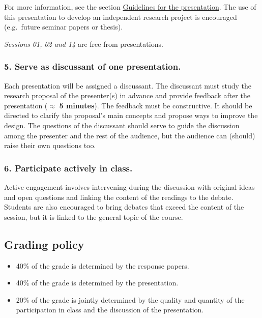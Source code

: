 \documentclass[
  12pt,
]{article}
\begin{document}
For more information, see the section
\protect\hyperlink{guidelines-for-the-presentation}{Guidelines for the
presentation}. The use of this presentation to develop an independent
research project is encouraged (e.g.~future seminar papers or thesis).

\emph{Sessions 01, 02 and 14} are free from presentations.

\hypertarget{serve-as-discussant-of-one-presentation.}{%
\subsubsection{5. Serve as discussant of one
presentation.}\label{serve-as-discussant-of-one-presentation.}}

Each presentation will be assigned a discussant. The discussant must
study the research proposal of the presenter(s) in advance and provide
feedback after the presentation (\(\approx\) \textbf{5 minutes}). The
feedback must be constructive. It should be directed to clarify the
proposal's main concepts and propose ways to improve the design. The
questions of the discussant should serve to guide the discussion among
the presenter and the rest of the audience, but the audience can
(should) raise their own questions too.

\hypertarget{participate-actively-in-class.}{%
\subsubsection{6. Participate actively in
class.}\label{participate-actively-in-class.}}

Active engagement involves intervening during the discussion with
original ideas and open questions and linking the content of the
readings to the debate. Students are also encouraged to bring debates
that exceed the content of the session, but it is linked to the general
topic of the course.

\hypertarget{grading-policy}{%
\subsection{Grading policy}\label{grading-policy}}

\begin{itemize}
\item
  40\% of the grade is determined by the response papers.
\item
  40\% of the grade is determined by the presentation.
\item
  20\% of the grade is jointly determined by the quality and quantity of
  the participation in class and the discussion of the presentation.
\end{itemize}
\end{document}
